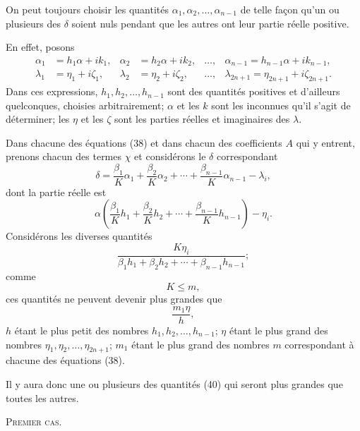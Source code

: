 \documentclass[11pt]{article}
\begin{document}
On peut toujours choisir les quantités $\alpha_1,\alpha_2,\ldots,\alpha_{n-1}$ de telle façon qu’un ou plusieurs des $\delta$ soient nuls pendant que les autres ont leur partie réelle positive.

En effet, posons
\[
\begin{aligned}
\alpha_1&=h_1\alpha+ik_1,& \alpha_2&=h_2\alpha+ik_2,& \ldots,& \alpha_{n-1}=h_{n-1}\alpha+ik_{n-1},\\
\lambda_1&=\eta_1+i\zeta_1,& \lambda_2&=\eta_2+i\zeta_2,& \ldots,& \lambda_{2n+1}=\eta_{2n+1}+i\zeta_{2n+1}.
\end{aligned}
\]
Dans ces expressions, $h_1,h_2,\ldots,h_{n-1}$ sont des quantités positives et d’ailleurs quelconques, choisies arbitrairement; $\alpha$ et les $k$ sont les inconnues qu’il s’agit de déterminer; les $\eta$ et les $\zeta$ sont les parties réelles et imaginaires des $\lambda$.

Dans chacune des équations (38) et dans chacun des coefficients $A$ qui y entrent, prenons chacun des termes $\chi$ et considérons le $\delta$ correspondant
\[
\delta=\frac{\beta_1}{K}\alpha_1+\frac{\beta_2}{K}\alpha_2+\cdots+\frac{\beta_{n-1}}{K}\alpha_{n-1}-\lambda_i,
\]
dont la partie réelle est
\[
\alpha\left(\frac{\beta_1}{K}h_1+\frac{\beta_2}{K}h_2+\cdots+\frac{\beta_{n-1}}{K}h_{n-1}\right)-\eta_i.
\]
Considérons les diverses quantités
\begin{equation*}\tag{40}
\frac{K\eta_i}{\beta_1h_1+\beta_2h_2+\cdots+\beta_{n-1}h_{n-1}};
\end{equation*}
comme
\[
K\leq m,
\]
ces quantités ne peuvent devenir plus grandes que
\[
\frac{m_1\eta}{h},
\]
$h$ étant le plus petit des nombres $h_1,h_2,\ldots,h_{n-1}$; $\eta$ étant le plus grand des nombres $\eta_1,\eta_2,\ldots,\eta_{2n+1}$; $m_1$ étant le plus grand des nombres $m$ correspondant à chacune des équations (38).

Il y aura donc une ou plusieurs des quantités (40) qui seront plus grandes que toutes les autres.

\begin{center}
{\scshape Premier cas.}
\end{center}
\end{document}
